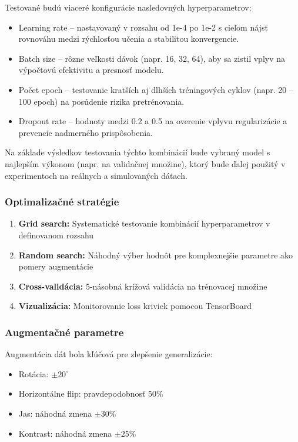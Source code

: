 Testované budú viaceré konfigurácie nasledovných hyperparametrov:
\begin{itemize}
    \item Learning rate – nastavovaný v rozsahu od 1e-4 po 1e-2 s cieľom nájsť rovnováhu medzi rýchlosťou učenia a stabilitou konvergencie.
    \item Batch size – rôzne veľkosti dávok (napr. 16, 32, 64), aby sa zistil vplyv na výpočtovú efektivitu a presnosť modelu.
    \item Počet epoch – testovanie kratších aj dlhších tréningových cyklov (napr. 20 – 100 epoch) na posúdenie rizika pretrénovania.
    \item Dropout rate – hodnoty medzi 0.2 a 0.5 na overenie vplyvu regularizácie a prevencie nadmerného prispôsobenia.
\end{itemize}

Na základe výsledkov testovania týchto kombinácií bude vybraný model s najlepším výkonom (napr. na validačnej množine), ktorý bude ďalej použitý v experimentoch na reálnych a simulovaných dátach.
\subsubsection{Optimalizačné stratégie}

\begin{enumerate}
    \item \textbf{Grid search:} Systematické testovanie kombinácií hyperparametrov v definovanom rozsahu
    \item \textbf{Random search:} Náhodný výber hodnôt pre komplexnejšie parametre ako pomery augmentácie
    \item \textbf{Cross-validácia:} 5-násobná krížová validácia na trénovacej množine
    \item \textbf{Vizualizácia:} Monitorovanie loss kriviek pomocou TensorBoard
\end{enumerate}

\subsubsection{Augmentačné parametre}

Augmentácia dát bola kľúčová pre zlepšenie generalizácie:
\begin{itemize}
    \item Rotácia: $\pm 20^\circ$
    \item Horizontálne flip: pravdepodobnosť 50\%
    \item Jas: náhodná zmena $\pm 30\%$
    \item Kontrast: náhodná zmena $\pm 25\%$
\end{itemize}

